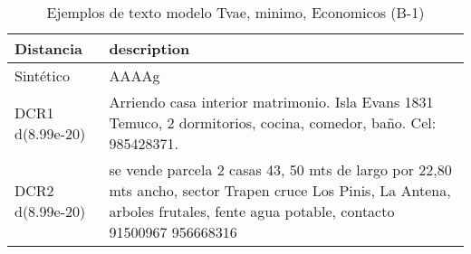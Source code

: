 \begin{table}[H]
\centering
\fontsize{10}{14}\selectfont
\caption{Ejemplos de texto modelo Tvae, minimo, Economicos (B-1)}
\label{table-example-economicos-b-1-tvae-min-text}
\begin{tabular}{|l|m{35em}|}
\hline
\rowcolor[gray]{0.8}
Distancia & description \\
\hline Sintético & AAAAg \\
\hline DCR1 d(8.99e-20) & Arriendo casa interior matrimonio. Isla Evans 1831 Temuco, 2 dormitorios, cocina, comedor, ba\~no. Cel: 985428371. \\
\hline DCR2 d(8.99e-20) & se vende parcela 2 casas 43, 50 mts de largo por 22,80 mts ancho, sector Trapen cruce Los Pinis, La Antena, arboles frutales, fente agua potable, contacto 91500967 956668316 \\
\hline
\end{tabular}
\end{table}
